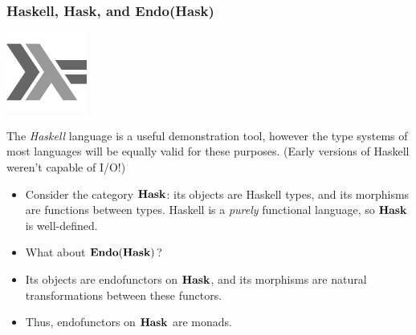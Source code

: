 \documentclass{beamer}
\numberwithin{figure}{section}
\DeclareMathOperator{\catendo}{\text{\textbf{Endo}}}
\DeclareMathOperator{\cathask}{\text{\textbf{Hask}}}
\begin{document}
\begin{frame}
        \frametitle{Haskell, \textbf{Hask}, and \textbf{Endo}(\textbf{Hask})}
        \begin{center}
                \begin{minipage}{.2\textwidth}
                        \includegraphics{hasklogo.pdf}
                \end{minipage}
                \begin{minipage}{.7\textwidth}
                        The \textit{Haskell} language is a useful demonstration
                        tool, however the type systems of most languages will be
                        equally valid for these purposes. (Early versions of
                        Haskell weren't capable of I/O!)
                \end{minipage}
        \end{center}
        \pause
        \begin{itemize}[<+->]
                \item Consider the category $\cathask$: its objects are Haskell
                        types, and its morphisms are functions between types.
                        Haskell is a \textit{purely} functional language, so
                        $\cathask$ is well-defined.
                \item What about $\catendo(\cathask)$?
                \item Its objects are endofunctors on $\cathask$, and its
                        morphisms are natural transformations between these
                        functors.
                \item Thus, endofunctors on $\cathask$ are monads.
        \end{itemize}
\end{frame}
\end{document}
